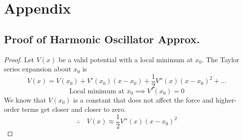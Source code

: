\chapter{Appendix}

\section{Proof of Harmonic Oscillator Approx.} \label{app:HO}

\begin{proof}
Let $V(x)$ be a valid potential with a local minimum at $x_0$. The Taylor series expansion about $x_0$ is
\begin{equation*}
    V(x) = V(x_0) + V'(x_0)(x-x_0) + \frac{1}{2} V''(x)(x-x_0)^2 + \dots
\end{equation*}
\begin{equation*}
    \text{Local minimum at } x_0 \implies V'(x_0) = 0
\end{equation*}
We know that $V(x_0)$ is a constant that does not affect the force and higher-order terms get closer and closer to zero.
\begin{equation*}
   \therefore \quad V(x) \approx \frac{1}{2} V''(x)(x-x_0)^2
\end{equation*}
\end{proof}